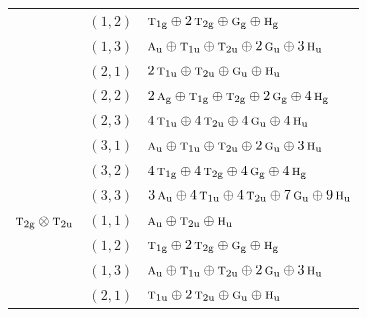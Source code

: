 \documentclass[11pt]{article}
\newcommand{\irr}[1]{\text{\normalfont\scshape #1}}
\newcommand{\ptag}[1]{\mathrm{#1}}
\begin{document}
\begin{longtable}{p{} c p{}}
 & $(1,2)$ & $\irr{t}_{1\ptag{g}}\oplus 2\,\irr{t}_{2\ptag{g}}\oplus \irr{g}_{\ptag{g}}\oplus \irr{h}_{\ptag{g}}$\\

 & $(1,3)$ & $\irr{a}_{\ptag{u}}\oplus \irr{t}_{1\ptag{u}}\oplus \irr{t}_{2\ptag{u}}\oplus 2\,\irr{g}_{\ptag{u}}\oplus 3\,\irr{h}_{\ptag{u}}$\\

 & $(2,1)$ & $2\,\irr{t}_{1\ptag{u}}\oplus \irr{t}_{2\ptag{u}}\oplus \irr{g}_{\ptag{u}}\oplus \irr{h}_{\ptag{u}}$\\

 & $(2,2)$ & $2\,\irr{a}_{\ptag{g}}\oplus \irr{t}_{1\ptag{g}}\oplus \irr{t}_{2\ptag{g}}\oplus 2\,\irr{g}_{\ptag{g}}\oplus 4\,\irr{h}_{\ptag{g}}$\\

 & $(2,3)$ & $4\,\irr{t}_{1\ptag{u}}\oplus 4\,\irr{t}_{2\ptag{u}}\oplus 4\,\irr{g}_{\ptag{u}}\oplus 4\,\irr{h}_{\ptag{u}}$\\

 & $(3,1)$ & $\irr{a}_{\ptag{u}}\oplus \irr{t}_{1\ptag{u}}\oplus \irr{t}_{2\ptag{u}}\oplus 2\,\irr{g}_{\ptag{u}}\oplus 3\,\irr{h}_{\ptag{u}}$\\

 & $(3,2)$ & $4\,\irr{t}_{1\ptag{g}}\oplus 4\,\irr{t}_{2\ptag{g}}\oplus 4\,\irr{g}_{\ptag{g}}\oplus 4\,\irr{h}_{\ptag{g}}$\\

 & $(3,3)$ & $3\,\irr{a}_{\ptag{u}}\oplus 4\,\irr{t}_{1\ptag{u}}\oplus 4\,\irr{t}_{2\ptag{u}}\oplus 7\,\irr{g}_{\ptag{u}}\oplus 9\,\irr{h}_{\ptag{u}}$\\

\hline

$\irr{t}_{2\ptag{g}}\otimes \irr{t}_{2\ptag{u}}$ & $(1,1)$ & $\irr{a}_{\ptag{u}}\oplus \irr{t}_{2\ptag{u}}\oplus \irr{h}_{\ptag{u}}$\\

 & $(1,2)$ & $\irr{t}_{1\ptag{g}}\oplus 2\,\irr{t}_{2\ptag{g}}\oplus \irr{g}_{\ptag{g}}\oplus \irr{h}_{\ptag{g}}$\\

 & $(1,3)$ & $\irr{a}_{\ptag{u}}\oplus \irr{t}_{1\ptag{u}}\oplus \irr{t}_{2\ptag{u}}\oplus 2\,\irr{g}_{\ptag{u}}\oplus 3\,\irr{h}_{\ptag{u}}$\\

 & $(2,1)$ & $\irr{t}_{1\ptag{u}}\oplus 2\,\irr{t}_{2\ptag{u}}\oplus \irr{g}_{\ptag{u}}\oplus \irr{h}_{\ptag{u}}$\\


\end{longtable}
\end{document}
